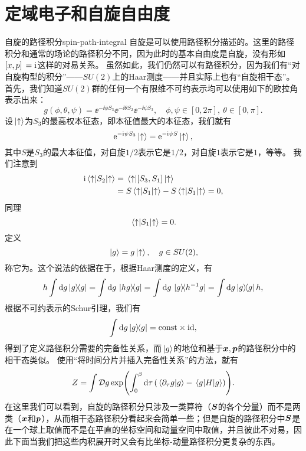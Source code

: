 \chapter{定域电子和自旋自由度}


\begin{back}{自旋的路径积分}{spin-path-integral}
    自旋是可以使用路径积分描述的。这里的路径积分和通常的场论的路径积分不同，因为此时的基本自由度是自旋，没有形如$\comm*{x}{p} = \ii$这样的对易关系。
    虽然如此，我们仍然可以有路径积分，因为我们有“对自旋构型的积分”——$SU(2)$上的Haar测度——并且实际上也有“自旋相干态”。
    首先，我们知道$SU(2)$群的任何一个有限维不可约表示均可以使用如下的欧拉角表示出来：
    \begin{equation}
        g(\phi, \theta, \psi) = \ee^{- \ii \phi S_3} \ee^{- \ii \theta S_2} \ee^{- \ii \psi S_3}, \quad \phi, \psi \in [0, 2\pi], \ \theta \in [0, \pi].
    \end{equation}
    设$\ket*{\uparrow}$为$S_3$的最高权本征态，即本征值最大的本征态，我们就有
    \begin{equation}
        \mathrm{e}^{- \mathrm{i} \psi S_3} \ket*{\uparrow} = \mathrm{e}^{- \mathrm{i} \psi S} \ket*{\uparrow},
    \end{equation}
    其中$S$是$S_3$的最大本征值，对自旋$1/2$表示它是$1/2$，对自旋$1$表示它是$1$，等等。
    我们注意到
    \[
        \begin{aligned}
            \ii \mel*{\uparrow}{S_2}{\uparrow} &= \mel*{\uparrow}{\comm*{S_3}{S_1}}{\uparrow} \\
            &= S \mel*{\uparrow}{S_1}{\uparrow} - S \mel*{\uparrow}{S_1}{\uparrow} = 0,
        \end{aligned}
    \]
    同理
    \[
        \mel*{\uparrow}{S_1}{\uparrow} = 0.
    \]
    定义
    \begin{equation}
        \ket*{g} = g \ket*{\uparrow}, \quad g \in SU(2),
    \end{equation}
    称它为。这个说法的依据在于，根据Haar测度的定义，有
    \[
        h \int \dd{g} \dyad{g} = \int \dd{g} \dyad*{hg}{g} = \int \dd{g} \dyad*{g}{h^{-1} g} = \int \dd{g} \dyad{g} h, 
    \]
    根据不可约表示的Schur引理，我们有
    \begin{equation}
        \int \dd{g} \dyad{g} = \const \times \mathrm{id}, 
    \end{equation}
    得到了定义路径积分需要的完备性关系，而$\ket*{g}$的地位和基于$\vb*{x}, \vb*{p}$的路径积分中的相干态类似。
    使用“将时间分片并插入完备性关系”的方法，就有
    \begin{equation}
        Z = \int \mathcal{D} g \exp(\int_0^\beta \dd{\tau} (\braket*{\partial_\tau g}{g} - \mel*{g}{H}{g})).
        \label{eq:spin-partition-original}
    \end{equation}
    在这里我们可以看到，自旋的路径积分只涉及一类算符（$\vb*{S}$的各个分量）而不是两类（$\vb*{x}$和$\vb*{p}$），从而相干态路径积分看起来会简单一些；但是自旋的路径积分中$\vb*{S}$是在一个球上取值而不是在平直的坐标空间和动量空间中取值，并且彼此不对易，因此下面当我们把这些内积展开时又会有比坐标-动量路径积分更复杂的东西。


\end{back}
